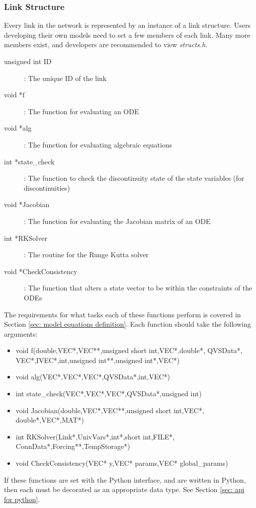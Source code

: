 \documentclass[12pt]{article}
\begin{document}
\subsubsection{Link Structure} \label{sec: link structure}

Every link in the network is represented by an instance of a link structure. Users developing their own models need to set a few members of each link. Many more members exist, and developers are recommended to view \emph{structs.h}.
\begin{description}
 \item[unsigned int ID]: The unique ID of the link
 \item[void *f]: The function for evaluating an ODE
 \item[void *alg]: The function for evaluating algebraic equations
 \item[int *state\_check]: The function to check the discontinuity state of the state variables (for discontinuities)
 \item[void *Jacobian]: The function for evaluating the Jacobian matrix of an ODE
 \item[int *RKSolver]: The routine for the Runge Kutta solver
 \item[void *CheckConsistency]: The function that alters a state vector to be within the constraints of the ODEs
\end{description}
The requirements for what tasks each of these functions perform is covered in Section \ref{sec: model equations definition}. Each function should take the following arguments:
\begin{itemize}
 \item \raggedright{void f(double,VEC*,VEC**,unsigned short int,VEC*,double*, QVSData*, VEC*,IVEC*,int,unsigned int**,unsigned int*,VEC*)}
 \item void alg(VEC*,VEC*,VEC*,QVSData*,int,VEC*)
 \item int state\_check(VEC*,VEC*,VEC*,QVSData*,unsigned int)
 \item void Jacobian(double,VEC*,VEC**,unsigned short int,VEC*, double*,VEC*,MAT*)
 \item int RKSolver(Link*,UnivVars*,int*,short int,FILE*, ConnData*,Forcing**,TempStorage*)
 \item void CheckConsistency(VEC* y,VEC* params,VEC* global\_params)
\end{itemize}
If these functions are set with the Python interface, and are written in Python, then each must be decorated as an appropriate data type. See Section \ref{sec: api for python}.
\end{document}
